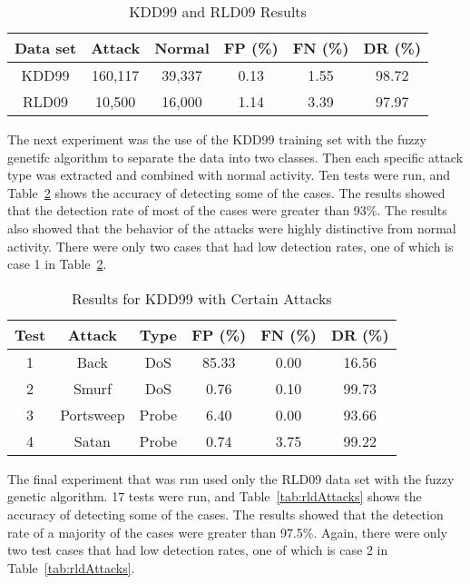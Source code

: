 \documentclass{sig-alternate}
\begin{document}
\begin{table}
\caption{KDD99 and RLD09 Results}
\vspace{0.20cm}
\begin{tabular}{cccccc}
Data set & Attack & Normal & FP (\%) & FN (\%) & DR (\%)\\ \hline
KDD99 & 160,117 & 39,337 & 0.13 & 1.55 & 98.72\\
RLD09 & 10,500 & 16,000 & 1.14 & 3.39 & 97.97\\
\end{tabular}
\label{tab:bothSetsResults}
\end{table}

The next experiment was the use of the KDD99 training set with the fuzzy genetifc algorithm to separate the data into two classes. Then each specific attack type was extracted and combined with normal activity. Ten tests were run, and Table~\ref{tab:kddAttacks} shows the accuracy of detecting some of the cases. The results showed that the detection rate of most of the cases were greater than 93\%. The results also showed that the behavior of the attacks were highly distinctive from normal activity. There were only two cases that had low detection rates, one of which is case 1 in Table~\ref{tab:kddAttacks}.

\begin{table}
\caption{Results for KDD99 with Certain Attacks}
\vspace{0.20cm}
\begin{tabular}{cccccc}
Test & Attack & Type & FP (\%) & FN (\%) & DR (\%)\\ \hline
1 & Back & DoS & 85.33 & 0.00 & 16.56\\
2 & Smurf & DoS & 0.76 & 0.10 & 99.73\\
3 & Portsweep & Probe & 6.40 & 0.00 & 93.66\\
4 & Satan & Probe & 0.74 & 3.75 & 99.22\\
\end{tabular}
\label{tab:kddAttacks}
\end{table}

The final experiment that was run used only the RLD09 data set with the fuzzy genetic algorithm. 17 tests were run, and Table~\ref{tab:rldAttacks} shows the accuracy of detecting some of the cases. The results showed that the detection rate of a majority of the cases were greater than 97.5\%. Again, there were only two test cases that had low detection rates, one of which is case 2 in Table~\ref{tab:rldAttacks}.
\end{document}
